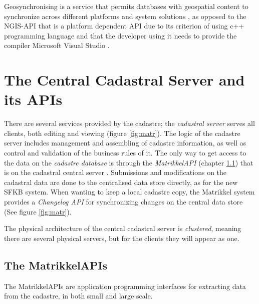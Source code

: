 Geosynchronising is a service that permits databases with geospatial content to synchronize across different platforms and system solutions \citep{Kartverket2013}, as opposed to the NGIS-API that is a platform dependent API due to its criterion of using c++ programming language and that the developer using it needs to provide the compiler Microsoft Visual Studio \citep{Kartverket2017b, Norkart2011}.

\section{The Central Cadastral Server and its APIs}
There are several services provided by the cadastre; the \textit{cadastral server} serves all clients, both editing and viewing (figure \ref{fig:matr}). The logic of the cadastre server includes management and assembling of cadastre information, as well as control and validation of the business rules of it. The only way to get access to the data on the \textit{cadastre database} is through the \textit{MatrikkelAPI} (chapter \ref{matrikkelapi}) that is on the cadastral central server \citep[p.~338]{Matrikkelavdelingen2017}. Submissions and modifications on the cadastral data are done to the centralised data store directly, as for the new SFKB system. When wanting to keep a local cadastre copy, the Matrikkel system provides a \textit{Changelog API} for synchronizing changes on the central data store (See figure \ref{fig:matr}). 

The physical architecture of the central cadastral server is \textit{clustered}, meaning there are several physical servers, but for the clients they will appear as one. %


\subsection{The MatrikkelAPIs} \label{matrikkelapi}
The MatrikkelAPIs are application programming interfaces for extracting data from the cadastre, in both small and large scale.  

